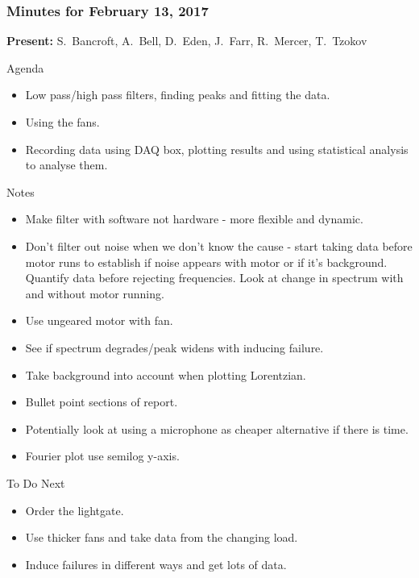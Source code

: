 \subsubsection*{Minutes for February 13, 2017}

\textbf{Present:} 
{S.~Bancroft,
  A.~Bell,
  D.~Eden,
  J.~Farr,
  R.~Mercer,
  T.~Tzokov}
  
\large{Agenda}
\begin{itemize}
\item
Low pass/high pass filters, finding peaks and fitting the data.

\item
Using the fans.

\item
Recording data using DAQ box, plotting results and using statistical analysis to analyse them.
\end{itemize}

\large{Notes}
\begin{itemize}
\item
Make filter with software not hardware - more flexible and dynamic.

\item
Don't filter out noise when we don't know the cause - start taking data before motor runs to establish if noise appears with motor or if it's background. Quantify data before rejecting frequencies. Look at change in spectrum with and without motor running.

\item
Use ungeared motor with fan.

\item
See if spectrum degrades/peak widens with inducing failure.

\item
Take background into account when plotting Lorentzian.

\item
Bullet point sections of report.

\item
Potentially look at using a microphone as cheaper alternative if there is time.

\item
Fourier plot use semilog y-axis.
\end{itemize}


\large{To Do Next}
\begin{itemize}
\item
Order the lightgate.

\item
Use thicker fans and take data from the changing load.

\item
Induce failures in different ways and get lots of data.
\end{itemize}

